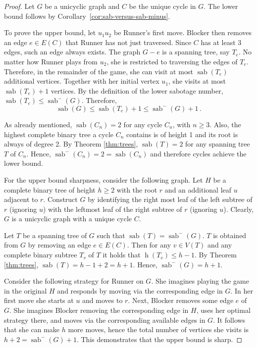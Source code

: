 \documentclass[10pt,a4paper]{amsart}
\DeclareMathOperator{\sab}{\mathrm{sab}}
\DeclareMathOperator{\height}{\mathrm{h}}
\begin{document}
\begin{proof}
Let $G$ be a unicyclic graph and $C$ be the unique cycle in $G$. The lower bound follows by Corollary~\ref{cor:sab-versus-sab-minus}. 

To prove the upper bound, let $u_1 u_2$ be Runner's first move. Blocker then removes an edge $e\in E(C)$ that Runner has not just traversed. Since $C$ has at least 3 edges, such an edge always exists. The graph $G-e$ is a spanning tree, say $T_e$. No matter how Runner plays from $u_2$, she is restricted to traversing the edges of $T_e$. Therefore, in the remainder of the game, she can visit at most $\sab(T_e)$ additional vertices. Together with her initial vertex $u_1$, she visits at most $\sab(T_e) + 1$ vertices. By the definition of the lower sabotage number, $\sab(T_e) \le \sab^{-}(G)$. Therefore, 
$$\sab(G) \le \sab(T_e) + 1 \le \sab^{-}(G) + 1\,.$$

As already mentioned, $\sab(C_n)=2$ for any cycle $C_n$, with $n\geq 3$. Also, the highest complete binary tree a cycle $C_n$ contains is of height 1 and its root is always of degree 2. By Theorem \ref{thm:trees}, $\sab(T)=2$ for any spanning tree $T$ of $C_n$. Hence, $\sab^{-}(C_n) = 2 = \sab(C_n)$ and therefore cycles achieve the lower bound.

For the upper bound sharpness, consider the following graph. Let $H$ be a complete binary tree of height $h\geq 2$ with the root $r$ and an additional leaf $u$ adjacent to $r$. Construct $G$ by identifying the right most leaf of the left subtree of $r$ (ignoring $u$) with the leftmost leaf of the right subtree of $r$ (ignoring $u$). Clearly, $G$ is a unicyclic graph with a unique cycle $C$. 

Let $T$ be a spanning tree of $G$ such that $\sab(T)=\sab^{-}(G)$. $T$ is obtained from $G$ by removing an edge $e\in E(C)$. Then for any $v\in V(T)$ and any complete binary subtree $T_v$ of $T$ it holds that $\height(T_v) \leq h-1$. By Theorem \ref{thm:trees}, $\sab(T) = h - 1 + 2 = h+1$. Hence, $\sab^{-}(G) = h+1$.

Consider the following strategy for Runner on $G$. She imagines playing the game in the original $H$ and responds by moving via the corresponding edge in $G$. In her first move she starts at $u$ and moves to $r$. Next, Blocker removes some edge $e$ of $G$. She imagines Blocker removing the corresponding edge in $H$, uses her optimal strategy there, and moves via the corresponding available edges in $G$. It follows that she can make $h$ more moves, hence the total number of vertices she visits is $h+2 = \sab^{-}(G)+1$. This demonstrates that the upper bound is sharp.
\end{proof}
\end{document}
